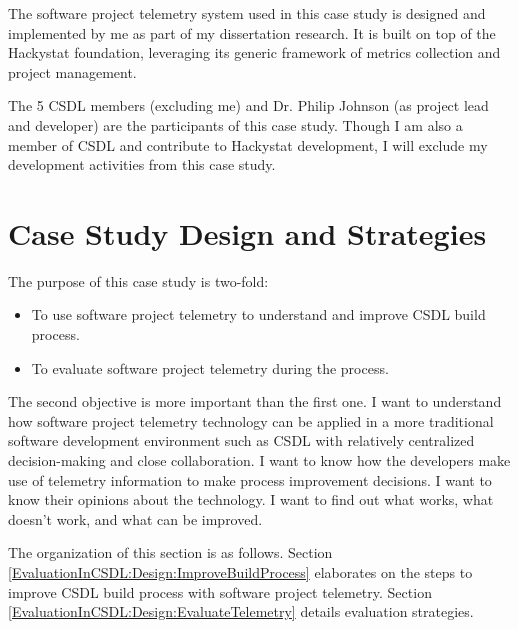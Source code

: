The software project telemetry system used in this case study is designed and implemented by me as part of my dissertation research. It is built on top of the Hackystat foundation, leveraging its generic framework of metrics collection and project management.

The 5 CSDL members (excluding me) and Dr. Philip Johnson (as project lead and developer) are the participants of this case study. Though I am also a member of CSDL and contribute to Hackystat development, I will exclude my development activities from this case study.






\section{Case Study Design and Strategies}  \label{EvaluationInCSDL:Design}

The purpose of this case study is two-fold:

\begin{itemize}
	\item To use software project telemetry to understand and improve CSDL build process.
	\item To evaluate software project telemetry during the process.
\end{itemize}

The second objective is more important than the first one. I want to understand how software project telemetry technology can be applied in a more traditional software development environment such as CSDL with relatively centralized decision-making and close collaboration. I want to know how the developers make use of telemetry information to make process improvement decisions. I want to know their opinions about the technology. I want to find out what works, what doesn't work, and what can be improved.
	
The organization of this section is as follows. 
Section \ref{EvaluationInCSDL:Design:ImproveBuildProcess} elaborates on the steps to improve CSDL build process with software project telemetry.
Section	\ref{EvaluationInCSDL:Design:EvaluateTelemetry} details evaluation strategies.
	
